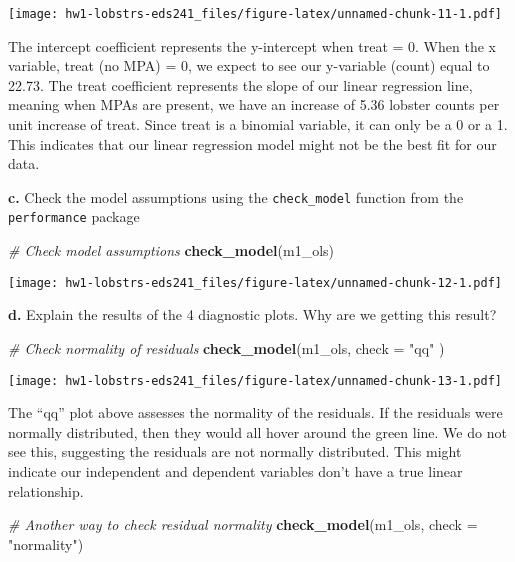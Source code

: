 \documentclass[
]{article}
\newenvironment{Shaded}{\begin{snugshade}}{\end{snugshade}}
\newcommand{\AttributeTok}[1]{\textcolor[rgb]{0.13,0.29,0.53}{#1}}
\newcommand{\CommentTok}[1]{\textcolor[rgb]{0.56,0.35,0.01}{\textit{#1}}}
\newcommand{\FunctionTok}[1]{\textcolor[rgb]{0.13,0.29,0.53}{\textbf{#1}}}
\newcommand{\NormalTok}[1]{#1}
\newcommand{\StringTok}[1]{\textcolor[rgb]{0.31,0.60,0.02}{#1}}
\begin{document}
\texttt{[image: hw1-lobstrs-eds241\_files/figure-latex/unnamed-chunk-11-1.pdf]}

The intercept coefficient represents the y-intercept when treat = 0.
When the x variable, treat (no MPA) = 0, we expect to see our y-variable
(count) equal to 22.73. The treat coefficient represents the slope of
our linear regression line, meaning when MPAs are present, we have an
increase of 5.36 lobster counts per unit increase of treat. Since treat
is a binomial variable, it can only be a 0 or a 1. This indicates that
our linear regression model might not be the best fit for our data.

\textbf{c.} Check the model assumptions using the \texttt{check\_model}
function from the \texttt{performance} package

\begin{Shaded}
\begin{Highlighting}[]
\CommentTok{\# Check model assumptions }
\FunctionTok{check\_model}\NormalTok{(m1\_ols)}
\end{Highlighting}
\end{Shaded}

\texttt{[image: hw1-lobstrs-eds241\_files/figure-latex/unnamed-chunk-12-1.pdf]}

\textbf{d.} Explain the results of the 4 diagnostic plots. Why are we
getting this result?

\begin{Shaded}
\begin{Highlighting}[]
\CommentTok{\# Check normality of residuals}
\FunctionTok{check\_model}\NormalTok{(m1\_ols,  }\AttributeTok{check =} \StringTok{"qq"}\NormalTok{ )}
\end{Highlighting}
\end{Shaded}

\texttt{[image: hw1-lobstrs-eds241\_files/figure-latex/unnamed-chunk-13-1.pdf]}

The ``qq'' plot above assesses the normality of the residuals. If the
residuals were normally distributed, then they would all hover around
the green line. We do not see this, suggesting the residuals are not
normally distributed. This might indicate our independent and dependent
variables don't have a true linear relationship.

\begin{Shaded}
\begin{Highlighting}[]
\CommentTok{\# Another way to check residual normality}
\FunctionTok{check\_model}\NormalTok{(m1\_ols, }\AttributeTok{check =} \StringTok{"normality"}\NormalTok{)}
\end{Highlighting}
\end{Shaded}
\end{document}
